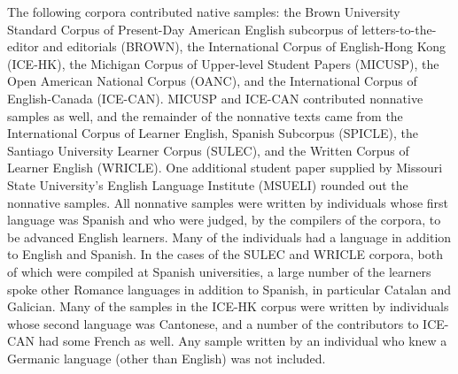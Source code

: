 \documentclass[main.tex]{subfiles}
\begin{document}
The following corpora contributed native samples: the Brown University Standard Corpus of Present-Day American English subcorpus of letters-to-the-editor and editorials (BROWN), the International Corpus of English-Hong Kong (ICE-HK), the Michigan Corpus of Upper-level Student Papers (MICUSP), the Open American National Corpus (OANC), and the International Corpus of English-Canada (ICE-CAN). MICUSP and ICE-CAN contributed nonnative samples as well, and the remainder of the nonnative texts came from the International Corpus of Learner English, Spanish Subcorpus (SPICLE), the Santiago University Learner Corpus (SULEC), and the Written Corpus of Learner English (WRICLE). One additional student paper supplied by Missouri State University's English Language Institute (MSUELI) rounded out the nonnative samples. All nonnative samples were written by individuals whose first language was Spanish and who were judged, by the compilers of the corpora, to be advanced English learners. Many of the individuals had a language in addition to English and Spanish. In the cases of the SULEC and WRICLE corpora, both of which were compiled at Spanish universities, a large number of the learners spoke other Romance languages in addition to Spanish, in particular Catalan and Galician. Many of the samples in the ICE-HK corpus were written by individuals whose second language was Cantonese, and a number of the contributors to ICE-CAN had some French as well. Any sample written by an individual who knew a Germanic language (other than English) was not included.

\biblio
\end{document}
